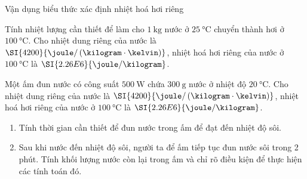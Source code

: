 \begin{dang}{Vận dụng biểu thức xác định nhiệt hoá hơi riêng}
	{Tính nhiệt lượng cần thiết để làm cho $\SI{1}{\kilogram}$ nước ở $\SI{25}{\celsius}$ chuyển thành hơi ở $\SI{100}{\celsius}$. Cho nhiệt dung riêng của nước là $\SI{4200}{\joule/\left(\kilogram\cdot\kelvin\right)}$, nhiệt hoá hơi riêng của nước ở $\SI{100}{\celsius}$ là $\SI{2.26E6}{\joule/\kilogram}$.
	
}
{
}


{Một ấm đun nước có công suất $\SI{500}{\watt}$ chứa $\SI{300}{\gram}$ nước ở nhiệt độ $\SI{20}{\celsius}$. Cho nhiệt dung riêng của nước là $\SI{4200}{\joule/\left(\kilogram\cdot\kelvin\right)}$, nhiệt hoá hơi riêng của nước ở $\SI{100}{\celsius}$ là $\SI{2.26E6}{\joule/\kilogram}$.
	\begin{enumerate}[label=\alph*)]
		\item Tính thời gian cần thiết để đun nước trong ấm để đạt đến nhiệt độ sôi.
		\item Sau khi nước đến nhiệt độ sôi, người ta để ấm tiếp tục đun nước sôi trong 2 phút. Tính khối lượng nước còn lại trong ấm và chỉ rõ điều kiện để thực hiện các tính toán đó.
	\end{enumerate}

}
\end{dang}

